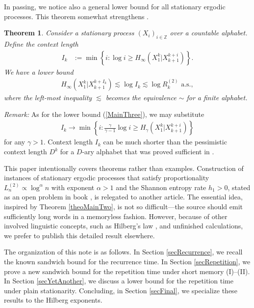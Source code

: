 \documentclass[a4paper,12pt]{article}
\newcommand{\klam}[1]{\left\{ #1 \right\}}
\newtheorem{theorem}{Theorem}
\begin{document}
In passing, we notice also a general lower bound for all stationary
ergodic processes. This theorem somewhat strengthens \citep[Theorem
8]{Debowski18b}.
\begin{theorem}
  \label{theoMainThree} 
  Consider a stationary process $(X_i)_{i\in\mathbb{Z}}$ over a
  countable alphabet. Define the context length
    \begin{align}
      \label{ContextLength}
      I_k&:=\min\klam{i:\log i\ge H_\infty(X_1^k|X_{k+1}^{k+i})}.
    \end{align}
    We have a lower bound
    \begin{align}
      \label{MainThree}
      H_\infty(X_1^k|X_{k+1}^{k+I_k})\lesssim
      \log I_k\lesssim
      \log R^{(2)}_k
      \text{ a.s.}
      ,
    \end{align}
    where the left-most inequality $\lesssim$ becomes the equivalence
    $\sim$ for a finite alphabet.  
\end{theorem}
\emph{Remark:} As for the lower bound (\ref{MainThree}), we may
substitute
\begin{align*}
  I_k\to\min\klam{i:\frac{\gamma}{\gamma-1}\log i\ge
  H_\gamma(X_1^k|X_{k+1}^{k+i})}
\end{align*}
for any $\gamma>1$.  Context length $I_k$ can be much shorter than the
pessimistic context length $D^k$ for a $D$-ary alphabet that was
proved sufficient in \citep[Theorem 8]{Debowski18b}.

This paper intentionally covers theorems rather than examples.
Construction of instances of stationary ergodic processes that satisfy
proportionality $L^{(2)}_n\propto \log^\alpha n$ with exponent
$\alpha>1$ and the Shannon entropy rate $h_1>0$, stated as an open
problem in book \citep{Debowski21}, is relegated to another
article. The essential idea, inspired by Theorem \ref{theoMainTwo}, is
not so difficult---the source should emit sufficiently long words in a
memoryless fashion. However, because of other involved linguistic
concepts, such as Hilberg's law \citep{Hilberg90, TakahiraOthers16,
  KaplanOther20, Debowski21}, and unfinished calculations, we prefer
to publish this detailed result elsewhere.

The organization of this note is as follows. In Section
\ref{secRecurrence}, we recall the known sandwich bound for the
recurrence time. In Section \ref{secRepetition}, we prove a new
sandwich bound for the repetition time under short memory
(I)--(II). In Section \ref{secYetAnother}, we discuss a lower bound for
the repetition time under plain stationarity.  Concluding, in Section
\ref{secFinal}, we specialize these results to the Hilberg exponents.
\end{document}
